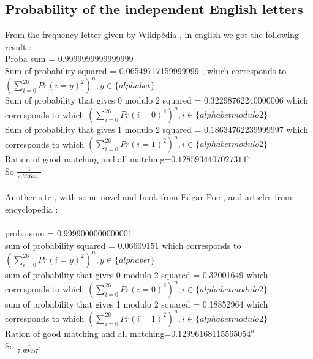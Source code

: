 \documentclass{article}
\begin{document}
\subsection{Probability of the independent English letters}
From the frequency letter given by Wikip\'edia , in english we got the following result :\\
Proba sum = 0.9999999999999999\\
Sum of probability squared = 0.06549717159999999 , which corresponds to $(\sum_{i=0}^{26}{Pr(i=y)^2})^n, y \in \{alphabet\} $\\
Sum of probability that gives 0 modulo 2 squared  = 0.32298762240000006 which corresponds to which $(\sum_{i=0}^{26}{Pr(i=0)^2})^n, i \in \{alphabet modulo 2\} $\\
Sum of probability that gives 1 modulo 2 squared = 0.18634762239999997 which corresponds to which $(\sum_{i=0}^{26}{Pr(i=1)^2})^n, i \in \{alphabet modulo 2\} $\\
Ration of good matching and all matching=$0.1285934407027314^n$\\
So $\frac{1}{7,77644^n}$
\\
\\
Another site , with some novel and book from Edgar Poe , and articles from encyclopedia :\\
\\
proba sum = 0.9999000000000001\\
sum of probability squared = 0.06609151 which corresponds to $(\sum_{i=0}^{26}{Pr(i=y)^2})^n, y \in \{alphabet\} $\\
sum of probability that gives 0 modulo 2 squared = 0.32001649 which corresponds to which $(\sum_{i=0}^{26}{Pr(i=0)^2})^n, i \in \{alphabet modulo 2\} $\\
sum of probability that gives 1 modulo 2 squared = 0.18852964 which corresponds to which $(\sum_{i=0}^{26}{Pr(i=1)^2})^n, i \in \{alphabet modulo 2\} $\\
Ration of good matching and all matching=$0.12996168115565054^n$\\
So $\frac{1}{7,69457^n}$
\end{document}
